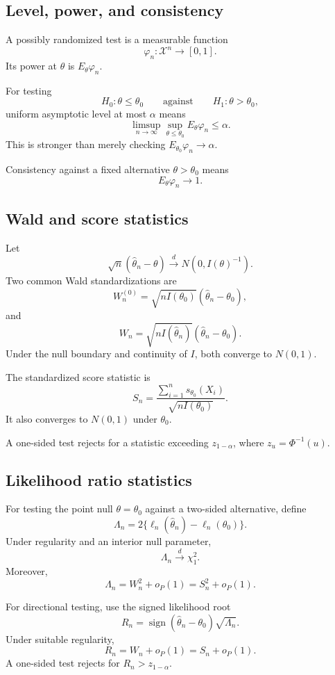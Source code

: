 \subsection{Level, power, and consistency}

A possibly randomized test is a measurable function
\[
\varphi_n:\mathcal X^n\to[0,1].
\]
Its power at $\theta$ is $E_\theta\varphi_n$.

For testing
\[
H_0:\theta\leq\theta_0
\qquad\text{against}\qquad
H_1:\theta>\theta_0,
\]
uniform asymptotic level at most $\alpha$ means
\[
\limsup_{n\to\infty}
\sup_{\theta\leq\theta_0}E_\theta\varphi_n
\leq\alpha.
\]
This is stronger than merely checking
$E_{\theta_0}\varphi_n\to\alpha$.

Consistency against a fixed alternative $\theta>\theta_0$ means
\[
E_\theta\varphi_n\to1.
\]

\subsection{Wald and score statistics}

Let
\[
\sqrt n(\widehat\theta_n-\theta)
\xrightarrow{d}N(0,I(\theta)^{-1}).
\]
Two common Wald standardizations are
\[
W_n^{(0)}
=
\sqrt{nI(\theta_0)}(\widehat\theta_n-\theta_0),
\]
and
\[
W_n=
\sqrt{nI(\widehat\theta_n)}
(\widehat\theta_n-\theta_0).
\]
Under the null boundary and continuity of $I$, both converge to
$N(0,1)$.

The standardized score statistic is
\[
S_n=
\frac{\sum_{i=1}^ns_{\theta_0}(X_i)}
{\sqrt{nI(\theta_0)}}.
\]
It also converges to $N(0,1)$ under $\theta_0$.

A one-sided test rejects for a statistic exceeding
$z_{1-\alpha}$, where $z_u=\Phi^{-1}(u)$.

\subsection{Likelihood ratio statistics}

For testing the point null $\theta=\theta_0$ against a two-sided
alternative, define
\[
\Lambda_n=
2\{\ell_n(\widehat\theta_n)-\ell_n(\theta_0)\}.
\]
Under regularity and an interior null parameter,
\[
\Lambda_n\xrightarrow{d}\chi_1^2.
\]
Moreover,
\[
\Lambda_n=W_n^2+o_P(1)=S_n^2+o_P(1).
\]

For directional testing, use the signed likelihood root
\[
R_n=
\operatorname{sign}(\widehat\theta_n-\theta_0)
\sqrt{\Lambda_n}.
\]
Under suitable regularity,
\[
R_n=W_n+o_P(1)=S_n+o_P(1).
\]
A one-sided test rejects for $R_n>z_{1-\alpha}$.

